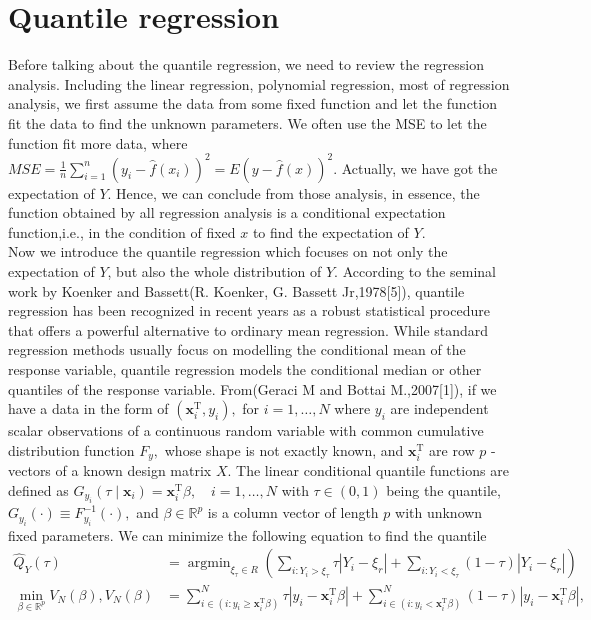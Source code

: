 \documentclass[mstat,12pt]{unswthesis}  %
\numberwithin{equation}{section}
\begin{document}
\section{Quantile regression}
Before talking about the quantile regression, we need to review the regression analysis. Including the linear regression, polynomial regression, most of regression analysis, we first assume the data from some fixed function and let the function fit the data to find the unknown parameters. We often use the MSE to let the function fit more data, where
$M S E=\frac{1}{n} \sum_{i=1}^{n}\left(y_{i}-\hat{f}\left(x_{i}\right)\right)^{2}=E(y-\hat{f}(x))^{2}$. Actually, we have got the expectation of $Y$. Hence, we can conclude from those analysis, in essence, the function obtained by all regression analysis is a conditional expectation function,i.e., in the condition of fixed $x$ to find the expectation of $Y$. \\
Now we introduce the quantile regression which focuses on not only the expectation of $Y$, but also the whole distribution of $Y$. According to the seminal work by Koenker and Bassett(R. Koenker, G. Bassett Jr,1978[5]), quantile regression has been recognized in recent years as a robust statistical procedure that offers a powerful alternative to ordinary mean regression. While standard regression methods usually focus on modelling the conditional mean of the response variable, quantile regression models the conditional median or other quantiles of the response variable. From(Geraci M and Bottai M.,2007[1]), if we have a data in the form of $\left(\mathbf{x}_{i}^{\mathrm{T}}, y_{i}\right),$ for $i=1, \ldots, N$ where $y_{i}$ are independent scalar observations of a continuous random variable with common cumulative distribution function $F_{y},$ whose shape is not exactly known, and $\mathbf{x}_{i}^{\mathrm{T}}$ are row $p$ -vectors of a known design matrix $X$. The linear conditional quantile functions are defined as $G_{y_{i}}\left(\tau \mid \mathbf{x}_{i}\right)=\mathbf{x}_{i}^{\mathrm{T}} \beta, \quad i=1, \ldots, N$ with $\tau \in (0,1)$ being the quantile, $G_{y_{i}}(\cdot) \equiv F_{y_{i}}^{-1}(\cdot),$ and $\beta \in \mathbb{R}^{p}$ is a column vector of length $p$ with unknown fixed parameters. We can minimize the following equation to find the quantile
\begin{equation}
\begin{split}
     \hat{Q}_{Y}(\tau) & =\operatorname{argmin}_{\xi_{\tau} \in R}\left(\sum_{i: Y_{i}>\xi_{\tau} } \tau\left|Y_{i}-\xi_{r}\right|+\sum_{i: Y_{i}<\xi_{\tau}  }(1-\tau)\left|Y_{i}-\xi_{r}\right|\right)\\
     \min _{\beta \in \mathbb{R}^{p}} V_{N}(\beta), V_{N}(\beta) & = \sum_{i \in\left(i: y_{i} \geqslant \mathbf{x}_{i}^{\mathrm{T}} \beta\right)}^{N} \tau\left|y_{i}-\mathbf{x}_{i}^{\mathrm{T}} \beta\right|+\sum_{i \in\left(i: y_{i}<\mathbf{x}_{i}^{\mathrm{T}} \beta\right)}^{N}(1-\tau)\left|y_{i}-\mathbf{x}_{i}^{\mathrm{T}} \beta\right|,
\end{split}
\end{equation}
\end{document}
